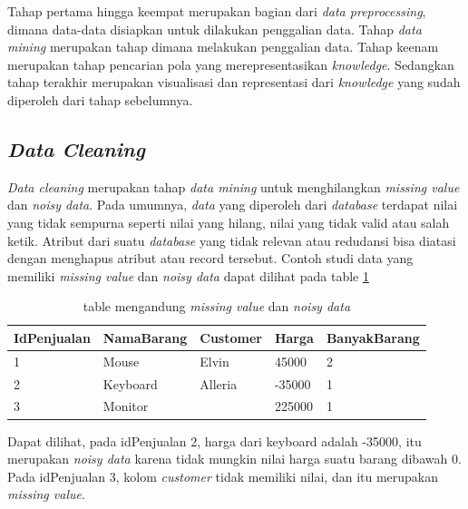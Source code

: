 Tahap pertama hingga keempat merupakan bagian dari \textsl{data preprocessing}, dimana data-data disiapkan untuk dilakukan penggalian data. Tahap \textsl{data mining} merupakan tahap dimana melakukan penggalian data. Tahap keenam merupakan tahap pencarian pola yang merepresentasikan \textsl{knowledge}. Sedangkan tahap terakhir merupakan visualisasi dan representasi dari \textsl{knowledge} yang sudah diperoleh dari tahap sebelumnya.


\subsection{\textsl{Data Cleaning}}
\textsl{Data cleaning} merupakan tahap \textsl{data mining} untuk menghilangkan \textsl{missing value} dan \textsl{noisy data}. Pada umumnya, \textsl{data} yang diperoleh dari \textsl{database} terdapat nilai yang tidak sempurna seperti nilai yang hilang, nilai yang tidak valid atau salah ketik. Atribut dari suatu \textsl{database} yang tidak relevan atau redudansi bisa diatasi dengan menghapus atribut atau record tersebut. Contoh studi data yang memiliki \textsl{missing value} dan \textsl{noisy data} dapat dilihat pada table \ref{table:contohMissingNNoisy}

\begin{table}[h]
\centering
\caption{table mengandung \textsl{missing value} dan \textsl{noisy data}}
\label{table:contohMissingNNoisy}
\begin{tabular}{|l|l|l|l|l|}
\hline
IdPenjualan & NamaBarang & Customer & Harga  & BanyakBarang \\ \hline
1           & Mouse      & Elvin    & 45000  & 2            \\ \hline
2           & Keyboard   & Alleria  & -35000 & 1            \\ \hline
3           & Monitor    &          & 225000 & 1            \\ \hline
\end{tabular}
\end{table}

Dapat dilihat, pada idPenjualan 2, harga dari keyboard adalah -35000, itu merupakan \textsl{noisy data} karena tidak mungkin nilai harga suatu barang dibawah 0. Pada idPenjualan 3, kolom \textsl{customer} tidak memiliki nilai, dan itu merupakan \textsl{missing value}.


